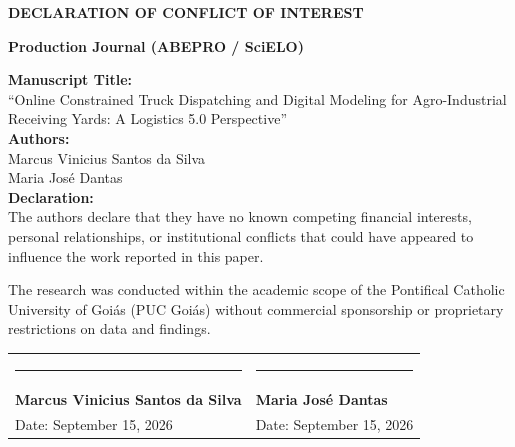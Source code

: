 \documentclass[12pt,a4paper]{article}
\begin{document}
\begin{center}
  {\Large\bfseries DECLARATION OF CONFLICT OF INTEREST\par}
  \vspace{1.5em}
  {\large\bfseries Production Journal (ABEPRO / SciELO)\par}
\end{center}

\vspace{2em}

\noindent\textbf{Manuscript Title:}\\
“Online Constrained Truck Dispatching and Digital Modeling for Agro-Industrial Receiving Yards: A Logistics 5.0 Perspective”\\[1.5em]

\noindent\textbf{Authors:}\\
Marcus Vinicius Santos da Silva\\
Maria Jos{\'e} Dantas\\[2em]

\noindent\textbf{Declaration:}\\
The authors declare that they have no known competing financial interests, personal relationships, or institutional conflicts that could have appeared to influence the work reported in this paper.

The research was conducted within the academic scope of the Pontifical Catholic University of Goi{\'a}s (PUC Goi{\'a}s) without commercial sponsorship or proprietary restrictions on data and findings.

\vspace{4em}

\noindent\begin{tabular}{@{}p{7cm}p{7cm}@{}}
\rule{6.5cm}{0.4pt} & \rule{6.5cm}{0.4pt}\\
\textbf{Marcus Vinicius Santos da Silva} & \textbf{Maria Jos{\'e} Dantas}\\
Date: September 15, 2026 & Date: September 15, 2026
\end{tabular}
\end{document}
